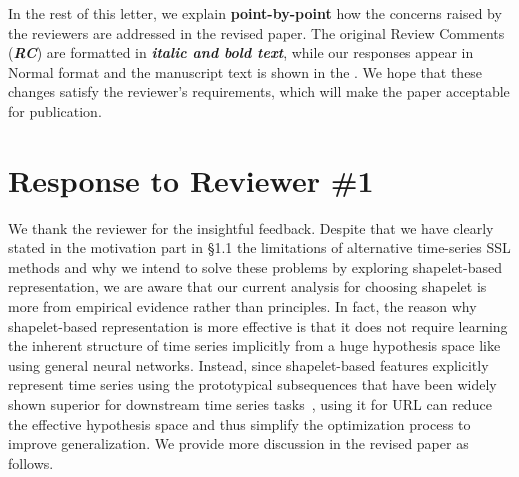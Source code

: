 \begin{sloppypar}
In the rest of this letter, we explain \textbf{point-by-point} how the concerns raised by the reviewers are addressed in the revised paper. The original Review Comments (\textbf{\textit{RC}}) are formatted in \textbf{\textit{italic and bold text}}, while our responses appear in Normal format and the manuscript text is shown in the . We hope that these changes satisfy the reviewer's requirements, which will make the paper acceptable for publication.


\section{Response to Reviewer \#1}


We thank the reviewer for the insightful feedback. Despite that we have clearly stated in the motivation part in \S 1.1 the limitations of alternative time-series SSL methods and why we intend to solve these problems by exploring shapelet-based representation, we are aware that our current analysis for choosing shapelet is more from empirical evidence rather than principles. In fact, the reason why shapelet-based representation is more effective is that it does not require learning the inherent structure of time series implicitly from a huge hypothesis space like using general neural networks. Instead, since shapelet-based features explicitly represent time series using the prototypical subsequences that have been widely shown superior for downstream time series tasks~\cite{Shapenet,liang2021efficient,liang2024fedst,USSL,MUSLA}, using it for URL can reduce the effective hypothesis space and thus simplify the optimization process to improve generalization. We provide more discussion in the revised paper as follows.


\end{sloppypar}
